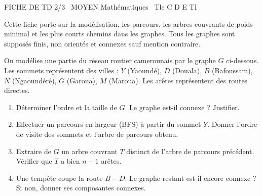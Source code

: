 \documentclass[11pt]{article}
\begin{document}
\begin{tcolorbox}[enhanced,colback=popink,colframe=popink,arc=10pt,boxrule=0pt,left=12pt,right=12pt,top=9pt,bottom=9pt]
{\color{white}\popxbold\small FICHE DE TD 2/3 \textbullet\ MOYEN \hfill Mathématiques \textbullet\ Tle C D E TI\par}
\end{tcolorbox}
\vspace{4pt}
\noindent Cette fiche porte sur la modélisation, les parcours, les arbres couvrants de poids minimal et les plus courts chemins dans les graphes. Tous les graphes sont supposés finis, non orientés et connexes sauf mention contraire.

\begin{exercice}
On modélise une partie du réseau routier camerounais par le graphe $G$ ci-dessous. Les sommets représentent des villes : $Y$ (Yaoundé), $D$ (Douala), $B$ (Bafoussam), $N$ (Ngaoundéré), $G$ (Garoua), $M$ (Maroua). Les arêtes représentent des routes directes.
\begin{center}
\end{center}
\begin{enumerate}
\item Déterminer l'ordre et la taille de $G$. Le graphe est-il connexe ? Justifier.
\item Effectuer un parcours en largeur (BFS) à partir du sommet $Y$. Donner l'ordre de visite des sommets et l'arbre de parcours obtenu.
\item Extraire de $G$ un arbre couvrant $T$ distinct de l'arbre de parcours précédent. Vérifier que $T$ a bien $n-1$ arêtes.
\item Une tempête coupe la route $B-D$. Le graphe restant est-il encore connexe ? Si non, donner ses composantes connexes.
\end{enumerate}
\end{exercice}
\end{document}
